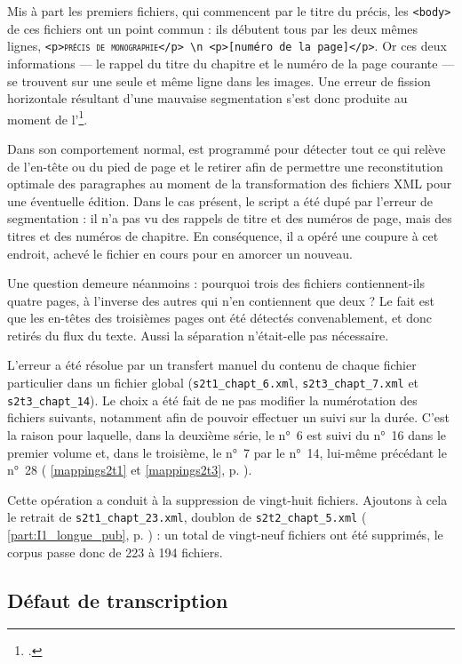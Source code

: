 Mis à part les premiers fichiers, qui commencent par le titre du précis, les \texttt{<body>} de ces fichiers ont un point commun : ils débutent tous par les deux mêmes lignes, \texttt{<p>\textsc{précis de monographie}</p> \textbackslash n <p>[numéro de la page]</p>}. Or ces deux informations --- le rappel du titre du chapitre et le numéro de la page courante --- se trouvent sur une seule et même ligne dans les images. Une erreur de fission horizontale résultant d'une mauvaise segmentation s'est donc produite au moment de l'\ocr\footcite[p. 5-6]{karpinski}.

Dans son comportement normal, \lse{} est programmé pour détecter tout ce qui relève de l'en-tête ou du pied de page et le retirer afin de permettre une reconstitution optimale des paragraphes au moment de la transformation des fichiers XML pour une éventuelle édition. Dans le cas présent, le script a été dupé par l'erreur de segmentation : il n'a pas vu des rappels de titre et des numéros de page, mais des titres et des numéros de chapitre. En conséquence, il a opéré une coupure à cet endroit, \cad{} achevé le fichier en cours pour en amorcer un nouveau.

Une question demeure néanmoins : pourquoi trois des fichiers contiennent-ils quatre pages, à l'inverse des autres qui n'en contiennent que deux ? Le fait est que les en-têtes des troisièmes pages ont été détectés convenablement, et donc retirés du flux du texte. Aussi la séparation n'était-elle pas nécessaire.

L'erreur a été résolue par un transfert manuel du contenu de chaque fichier particulier dans un fichier global (\texttt{s2t1\_chapt\_6.xml}, \texttt{s2t3\_chapt\_7.xml} et \texttt{s2t3\_chapt\_14}). Le choix a été fait de ne pas modifier la numérotation des fichiers suivants, notamment afin de pouvoir effectuer un suivi sur la durée. C'est la raison pour laquelle, dans la deuxième série, le n°~6 est suivi du n°~16 dans le premier volume et, dans le troisième, le  n°~7 par le n°~14, lui-même précédant le n°~28 (\ann{} \ref{mappings2t1} et \ref{mappings2t3}, p. \pageref{mappings2t1}).

Cette opération a conduit à la suppression de vingt-huit fichiers. Ajoutons à cela le retrait de \texttt{s2t1\_chapt\_23.xml}, doublon de \texttt{s2t2\_chapt\_5.xml} (\cf{} \ref{part:I1_longue_pub}, p. \pageref{part:I1_longue_pub}) : un total de vingt-neuf fichiers ont été supprimés, le corpus passe donc de 223 à 194 fichiers.

\subsection{Défaut de transcription}

